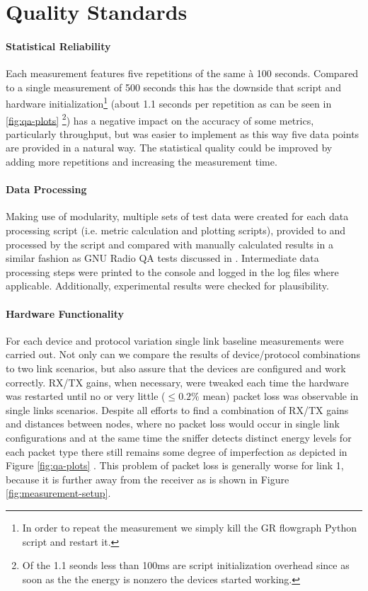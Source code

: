 \clearpage

\section{Quality Standards}

\paragraph{Statistical Reliability}
Each measurement features five repetitions of the same à 100 seconds. Compared to a single measurement of 500 seconds this has the downside that script and hardware initialization\footnote{In order to repeat the measurement we simply kill the GR flowgraph Python script and restart it.} (about 1.1 seconds per repetition as can be seen in \ref{fig:qa-plots} \footnote{Of the 1.1 seonds less than 100ms are script initialization overhead since as soon as the the energy is nonzero the devices started working.}) has a negative impact on the accuracy of some metrics, particularly throughput, but was easier to implement as this way five data points are provided in a natural way. The statistical quality could be improved by adding more repetitions and increasing the measurement time. 

\paragraph{Data Processing}
Making use of modularity, multiple sets of test data were created for each data processing script (i.e. metric calculation and plotting scripts), provided to and processed by the script and compared with manually calculated results in a similar fashion as GNU Radio QA tests discussed in \cite{gr-python-tut}. Intermediate data processing steps were printed to the console and logged in the log files where applicable. Additionally, experimental results were checked for plausibility. 

\paragraph{Hardware Functionality}
For each device and protocol variation single link baseline measurements were carried out. Not only can we compare the results of device/protocol combinations to two link scenarios, but also assure that the devices are configured and work correctly. RX/TX gains, when necessary, were tweaked each time the hardware was restarted until no or very little ($\le0.2\%$ mean) packet loss was observable in single links scenarios.
Despite all efforts to find a combination of RX/TX gains and distances between nodes, where no packet loss would occur in single link configurations and at the same time the sniffer detects distinct energy levels for each packet type there still remains some degree of imperfection as depicted in Figure \ref{fig:qa-plots} . This problem of packet loss is generally worse for link 1, because it is further away from the receiver as is shown in Figure \ref{fig:measurement-setup}.  

